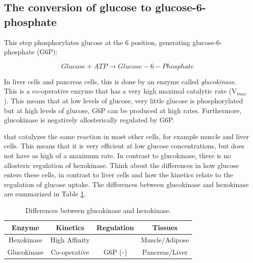 \documentclass{tufte-handout}
\begin{document}
\subsection{The conversion of glucose to glucose-6-phosphate}

   This step phosphorylates glucose at the 6 position, generating glucose-6-phosphate (G6P):

\begin{equation}\label{eq:glucokinase}
Glucose + ATP \rightarrow Glucose-6-Phosphate
\end{equation}

In liver cells and pancreas cells, this is done by an enzyme called \emph{glucokinase}.  This is a co-operative enzyme that has a very high maximal catalytic rate (V$_{max}$).  This means that at low levels of glucose, very little glucose is phosphorylated but at high levels of glucose, G6P can be produced at high rates.  Furthermore, glucokinase is negatively allosterically regulated by G6P.

 that catalyzes the same reaction in most other cells, for example muscle and liver cells.  This means that it is very efficient at low glucose concentrations, but does not have as high of a maximum rate.  In contrast to glucokinase, there is no allosteric regulation of hexokinase.  Think about the differences in how glucose enters these cells, in contrast to liver cells and how the kinetics relate to the regulation of glucose uptake.  The differences between glucokinase and hexokinase are summarized in Table \ref{tab:glucokinase}.

\begin{table}
\centering
\caption{Differences between glucokinase and hexokinase.}
\label{tab:glucokinase}
\begin{tabular}{cccc}
\hline
\textbf {Enzyme} & \textbf{Kinetics}  & \textbf{Regulation}  & \textbf{Tissues}\\
\hline
Hexokinase & High Affinity & & Muscle/Adipose\\
Glucokinase & Co-operative & G6P (-) & Pancreas/Liver\\

\hline
\end{tabular}
\end{table}
\end{document}
